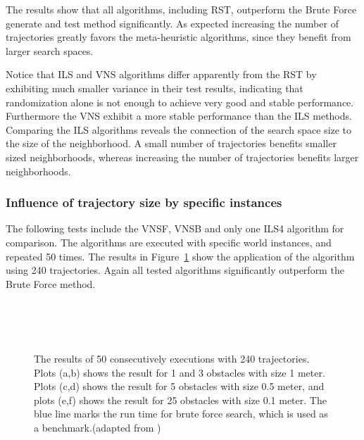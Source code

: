 The results show that all algorithms, including RST, outperform the Brute Force generate and test method significantly. 
As expected increasing the number of trajectories greatly favors the meta-heuristic algorithms, since they benefit from larger search spaces. 

Notice that ILS and VNS algorithms differ apparently from the RST by exhibiting much smaller variance in their test results, indicating that randomization alone is not enough to achieve very good and stable performance.
Furthermore the VNS exhibit a more stable performance than the ILS methods. 
Comparing the ILS algorithms reveals the connection of the search space size to the size of the neighborhood. 
A small number of trajectories benefits smaller sized neighborhoods, whereas increasing the number of trajectories benefits larger neighborhoods. 

\subsubsection{Influence of trajectory size by specific instances}
The following tests include the VNSF, VNSB and only one ILS4 algorithm for comparison. 
The algorithms are executed with specific world instances, and repeated 50 times. 
The results in Figure~\ref{fig:fig_special_240} show the application of the algorithm using 240 trajectories. Again  all tested algorithms significantly outperform the Brute Force method. 

\begin{figure}[thpb]
   \myfloatalign
    \tiny
          \centering
    \\
    \\
    \\
    {
    \captionsetup[subfigure]{labelformat=empty} 
    }
    \caption[Experiment: Specific instances with 240 trajectories]{The results of 50 consecutively executions with 240 trajectories. Plots (a,b) shows the result for 1 and 3 obstacles with size 1 meter. Plots (c,d) shows the result for 5 obstacles with size 0.5 meter, and plots (e,f) shows the result for 25 obstacles with size 0.1 meter. The blue line marks the run time for brute force search, which is used as a benchmark.(adapted from \cite{myself})}  
     \label{fig:fig_special_240}
\end{figure}

